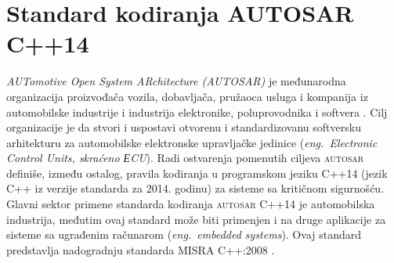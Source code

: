 \documentclass[12pt,oneside]{memoir}
\begin{document}











\chapter{Standard kodiranja \textsc{AUTOSAR} C++14}
\label{chp:autosar}

\textit{AUTomotive Open System ARchitecture (\textsc{AUTOSAR})} je međunarodna organizacija proizvođača vozila, dobavljača, pružaoca usluga i kompanija iz automobilske industrije i industrija elektronike, poluprovodnika i softvera \cite{autosarWebsite}. 
Cilj organizacije je da stvori i uspostavi otvorenu i standardizovanu softversku arhitekturu za automobilske elektronske upravljačke jedinice (\textit{eng.~Electronic Control Units, skra\'{c}eno ЕCU}).
Radi ostvarenja pomenutih ciljeva \textsc{autosar} definiše, između ostalog, pravila kodiranja u programskom jeziku C++14 (jezik C++ iz verzije standarda za 2014. godinu) za sisteme sa kriti\v{c}nom sigurno\v{s}\'{c}u. Glavni sektor primene standarda kodiranja \textsc{autosar} C++14 je automobilska industrija, međutim ovaj standard može biti primenjen
i na druge aplikacije za sisteme sa ugrađenim računarom (\textit{eng.~embedded systems}). Ovaj standard predstavlja nadogradnju standarda MISRA C++:2008 \cite{AutosarGuidelines}.
\end{document}
